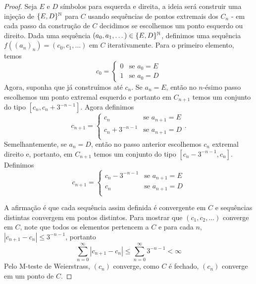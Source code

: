 \begin{enumerate}[label=(\alph*)]
\begin{proof}
        Seja $E$ e $D$ símbolos para esquerda e direita, a ideia será construir uma injeção de $\{E,D\}^{\mathbb{N}}$ para $C$
        usando sequências de pontos extremais dos $C_n$ - em cada passo da construção de $C$ 
        decidimos se escolhemos um ponto esquerdo ou direito. Dada uma sequência $(a_0, a_1, \dots) \in \{E,D\}^{\mathbb{N}}$, 
        definimos uma sequência $f((a_n)_n) = (c_0, c_1, \dots)$ em $C$  iterativamente. Para o primeiro elemento, temos
        $$c_0 = \begin{cases}
            0 & \text{se } a_0 = E\\
            1 & \text{se } a_0 = D
        \end{cases}$$
        Agora, suponha que já construímos até $c_n$. Se $a_{n} = E$, então no $n$-ésimo passo escolhemos um ponto extremal esquerdo e portanto
        em $C_{n+1}$ temos um conjunto do tipo $[c_{n}, c_{n} + 3^{-n-1}]$. Agora definimos 
        $$c_{n+1} = \begin{cases}
            c_{n} & \text{se } a_{n+1} = E\\
            c_{n} + 3^{-n - 1} & \text{se } a_{n+1} = D\\
        \end{cases}.$$
        Semelhantemente, se $a_{n} = D$, então no passo anterior escolhemos $c_n$ extremal direito e, portanto, 
        em $C_{n+1}$ temos um conjunto do tipo $[c_n - 3^{-n - 1}, c_n]$. Definimos
        $$c_{n+1} = \begin{cases}
            c_{n} - 3^{-n - 1} & \text{se } a_{n+1} = E\\
            c_{n} & \text{se } a_{n+1} = D\\
        \end{cases}$$

        A afirmação é que cada sequência assim definida é convergente em $C$ e sequências distintas convergem em pontos distintos.
        Para mostrar que $(c_1, c_2, \dots)$ converge em $C$, note que todos os elementos pertencem a $C$ e para cada $n$,
        $|c_{n+1} - c_n| \leq 3^{-n - 1}$, portanto 
        $$\sum_{n=0}^{\infty} |c_{n+1} - c_n| \leq \sum_{n=0}^{\infty} 3^{-n - 1} < \infty$$
        Pelo M-teste de Weierstrass, $(c_n)$ converge, como $C$ é fechado, $(c_n)$ converge em um ponto de $C$. 
        

\end{proof}
\end{enumerate}
